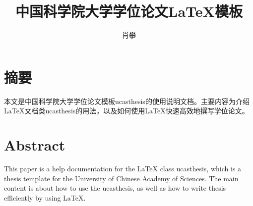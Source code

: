   \title[国科大学位论文\LaTeX{}模板]{中国科学院大学学位论文\LaTeX{}模板}%
  \author{肖攀}%
\maketitle
\makeenglishtitle
\makedeclaration

\chapter{摘\quad 要}%
本文是中国科学院大学学位论文模板ucasthesis的使用说明文档。主要内容为介绍\LaTeX{}文档类ucasthesis的用法，以及如何使用\LaTeX{}快速高效地撰写学位论文。



\chapter{Abstract}%
This paper is a help documentation for the \LaTeX{} class ucasthesis, which is  a thesis template for the University of Chinese Academy of Sciences. The main content is about how to use the ucasthesis, as well as how to write thesis efficiently by using \LaTeX{}.

